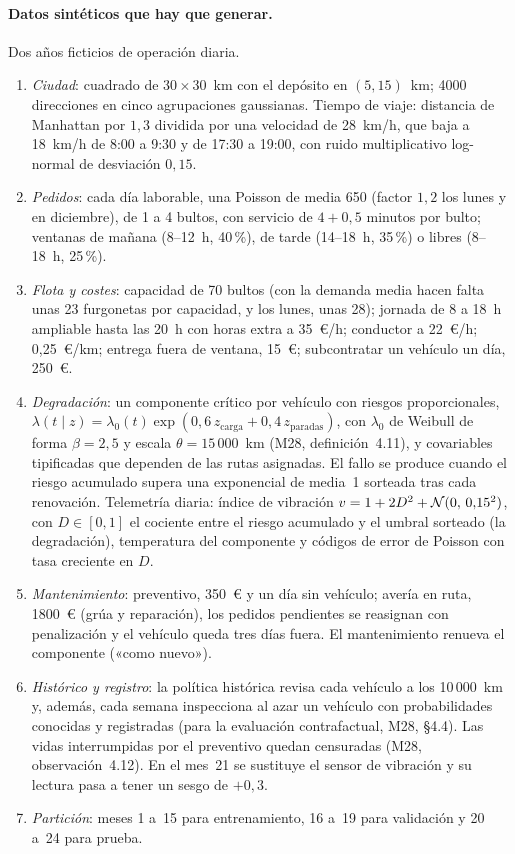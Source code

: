 \paragraph{Datos sintéticos que hay que generar.} Dos años ficticios de operación diaria.
\begin{enumerate}[label=(\roman*)]
  \item \emph{Ciudad}: cuadrado de $30\times 30$~km con el depósito en $(5,15)$~km; 4000 direcciones en cinco agrupaciones gaussianas. Tiempo de viaje: distancia de Manhattan por $1{,}3$ dividida por una velocidad de 28~km/h, que baja a 18~km/h de 8:00 a 9:30 y de 17:30 a 19:00, con ruido multiplicativo log-normal de desviación $0{,}15$.
  \item \emph{Pedidos}: cada día laborable, una Poisson de media 650 (factor $1{,}2$ los lunes y en diciembre), de 1 a 4 bultos, con servicio de $4+0{,}5$ minutos por bulto; ventanas de mañana (8--12~h, 40\,\%), de tarde (14--18~h, 35\,\%) o libres (8--18~h, 25\,\%).
  \item \emph{Flota y costes}: capacidad de 70 bultos (con la demanda media hacen falta unas 23 furgonetas por capacidad, y los lunes, unas 28); jornada de 8 a 18~h ampliable hasta las 20~h con horas extra a 35~€/h; conductor a 22~€/h; 0{,}25~€/km; entrega fuera de ventana, 15~€; subcontratar un vehículo un día, 250~€.
  \item \emph{Degradación}: un componente crítico por vehículo con riesgos proporcionales, $\lambda(t\mid z)=\lambda_0(t)\exp(0{,}6\,z_{\mathrm{carga}}+0{,}4\,z_{\mathrm{paradas}})$, con $\lambda_0$ de Weibull de forma $\beta=2{,}5$ y escala $\theta=15\,000$~km (M28, definición~4.11), y covariables tipificadas que dependen de las rutas asignadas. El fallo se produce cuando el riesgo acumulado supera una exponencial de media~1 sorteada tras cada renovación. Telemetría diaria: índice de vibración $v=1+2D^{2}+\mathcal{N}(0,\,0{,}15^{2})$, con $D\in[0,1]$ el cociente entre el riesgo acumulado y el umbral sorteado (la degradación), temperatura del componente y códigos de error de Poisson con tasa creciente en $D$.
  \item \emph{Mantenimiento}: preventivo, 350~€ y un día sin vehículo; avería en ruta, 1800~€ (grúa y reparación), los pedidos pendientes se reasignan con penalización y el vehículo queda tres días fuera. El mantenimiento renueva el componente («como nuevo»).
  \item \emph{Histórico y registro}: la política histórica revisa cada vehículo a los 10\,000~km y, además, cada semana inspecciona al azar un vehículo con probabilidades conocidas y registradas (para la evaluación contrafactual, M28, §4.4). Las vidas interrumpidas por el preventivo quedan censuradas (M28, observación~4.12). En el mes~21 se sustituye el sensor de vibración y su lectura pasa a tener un sesgo de $+0{,}3$.
  \item \emph{Partición}: meses 1 a~15 para entrenamiento, 16 a~19 para validación y 20 a~24 para prueba.
\end{enumerate}

